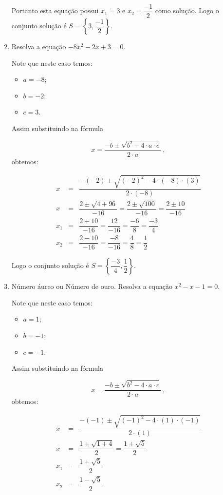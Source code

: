 \begin{exem}
\begin{enumerate}[1)]
 Portanto esta equação possui $x_1= 3$ e $x_2= \dfrac{-1}{2}$ como solução. Logo o conjunto solução é $S= \left\{3, \dfrac{-1}{2}\right\}$.

  \item Resolva a equação $-8x^2 - 2x + 3= 0$.

 Note que neste caso temos:
  \begin{itemize}
  \item $a= -8$;
  \item $b= -2$;
  \item $c= 3$.
  \end{itemize}
  Assim substituindo na fórmula

 \[x = \dfrac{-b \pm \sqrt{b^2 - 4 \cdot a \cdot c}}{2 \cdot a} \ ,\]
 obtemos:

 \begin{eqnarray*}
 x &=& \dfrac{-(-2) \pm \sqrt{(-2)^2 - 4 \cdot (-8) \cdot (3)}}{2 \cdot (-8)} \\
 x &=& \dfrac{2 \pm \sqrt{4 + 96}}{-16}= \dfrac{2 \pm \sqrt{100}}{-16}= \dfrac{2 \pm 10}{-16} \\
 x_1 &=& \dfrac{2 + 10}{-16}= \dfrac{12}{-16}= \dfrac{-6}{8}= \dfrac{-3}{4} \\
 x_2 &=& \dfrac{2 - 10}{-16}= \dfrac{-8}{-16}= \dfrac{4}{8}= \dfrac{1}{2}
 \end{eqnarray*}

 Logo o conjunto solução é $S= \left\{ \dfrac{-3}{4}, \dfrac{1}{2} \right\}$.

 \item Número áureo ou Número de ouro. Resolva a equação $x^2 - x - 1= 0$.

 Note que neste caso temos:
  \begin{itemize}
  \item $a= 1$;
  \item $b= -1$;
  \item $c= -1$.
  \end{itemize}
  Assim substituindo na fórmula

 \[x = \dfrac{-b \pm \sqrt{b^2 - 4 \cdot a \cdot c}}{2 \cdot a} \ ,\]
 obtemos:

 \begin{eqnarray*}
 x &=& \dfrac{-(-1) \pm \sqrt{(-1)^2 - 4 \cdot (1) \cdot (-1)}}{2 \cdot (1)} \\
 x &=& \dfrac{1 \pm \sqrt{1 + 4}}{2}= \dfrac{1 \pm \sqrt{5}}{2} \\
 x_1 &=& \dfrac{1 + \sqrt{5}}{2} \\
 x_2 &=& \dfrac{1 - \sqrt{5}}{2}
 \end{eqnarray*}


\end{enumerate}
\end{exem}
